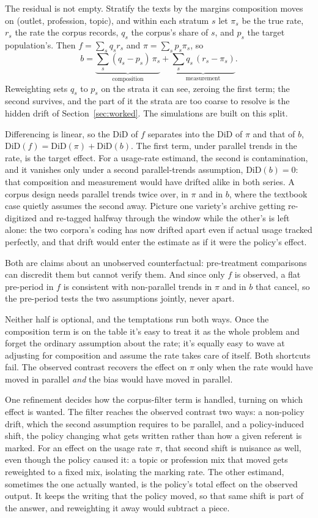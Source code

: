 The residual is not empty. Stratify the texts by the margins composition moves on (outlet, profession, topic), and within each stratum $s$ let $\pi_s$ be the true rate, $r_s$ the rate the corpus records, $q_s$ the corpus's share of $s$, and $p_s$ the target population's. Then $f = \sum_s q_s r_s$ and $\pi = \sum_s p_s \pi_s$, so
\[
b = \underbrace{\sum_s (q_s - p_s)\,\pi_s}_{\text{composition}} + \underbrace{\sum_s q_s\,(r_s - \pi_s)}_{\text{measurement}}.
\]
Reweighting sets $q_s$ to $p_s$ on the strata it can see, zeroing the first term; the second survives, and the part of it the strata are too coarse to resolve is the hidden drift of Section~\ref{sec:worked}. The simulations are built on this split.

Differencing is linear, so the DiD of $f$ separates into the DiD of $\pi$ and that of $b$, $\mathrm{DiD}(f) = \mathrm{DiD}(\pi) + \mathrm{DiD}(b)$. The first term, under parallel trends in the rate, is the target effect. For a usage-rate estimand, the second is contamination, and it vanishes only under a second parallel-trends assumption, $\mathrm{DiD}(b) = 0$: that composition and measurement would have drifted alike in both series. A corpus design needs parallel trends twice over, in $\pi$ and in $b$, where the textbook case quietly assumes the second away. Picture one variety's archive getting re-digitized and re-tagged halfway through the window while the other's is left alone: the two corpora's coding has now drifted apart even if actual usage tracked perfectly, and that drift would enter the estimate as if it were the policy's effect.

Both are claims about an unobserved counterfactual: pre-treatment comparisons can discredit them but cannot verify them. And since only $f$ is observed, a flat pre-period in $f$ is consistent with non-parallel trends in $\pi$ and in $b$ that cancel, so the pre-period tests the two assumptions jointly, never apart.

Neither half is optional, and the temptations run both ways. Once the composition term is on the table it's easy to treat it as the whole problem and forget the ordinary assumption about the rate; it's equally easy to wave at adjusting for composition and assume the rate takes care of itself. Both shortcuts fail. The observed contrast recovers the effect on $\pi$ only when the rate would have moved in parallel \emph{and} the bias would have moved in parallel.

One refinement decides how the corpus-filter term is handled, turning on which effect is wanted. The filter reaches the observed contrast two ways: a non-policy drift, which the second assumption requires to be parallel, and a policy-induced shift, the policy changing what gets written rather than how a given referent is marked. For an effect on the usage rate $\pi$, that second shift is nuisance as well, even though the policy caused it: a topic or profession mix that moved gets reweighted to a fixed mix, isolating the marking rate. The other estimand, sometimes the one actually wanted, is the policy's total effect on the observed output. It keeps the writing that the policy moved, so that same shift is part of the answer, and reweighting it away would subtract a piece.

